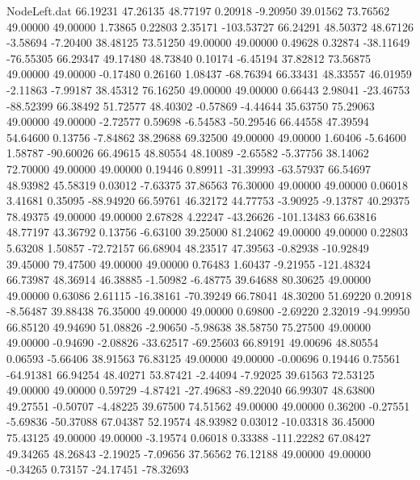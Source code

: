 \begin{filecontents}{NodeLeft.dat}
  66.19231   47.26135   48.77197     0.20918   -9.20950   39.01562   73.76562   49.00000   49.00000    1.73865    0.22803    2.35171 -103.53727
  66.24291   48.50372   48.67126    -3.58694   -7.20400   38.48125   73.51250   49.00000   49.00000    0.49628    0.32874  -38.11649  -76.55305
  66.29347   49.17480   48.73840     0.10174   -6.45194   37.82812   73.56875   49.00000   49.00000   -0.17480    0.26160    1.08437  -68.76394
  66.33431   48.33557   46.01959    -2.11863   -7.99187   38.45312   76.16250   49.00000   49.00000    0.66443    2.98041  -23.46753  -88.52399
  66.38492   51.72577   48.40302    -0.57869   -4.44644   35.63750   75.29063   49.00000   49.00000   -2.72577    0.59698   -6.54583  -50.29546
  66.44558   47.39594   54.64600     0.13756   -7.84862   38.29688   69.32500   49.00000   49.00000    1.60406   -5.64600    1.58787  -90.60026
  66.49615   48.80554   48.10089    -2.65582   -5.37756   38.14062   72.70000   49.00000   49.00000    0.19446    0.89911  -31.39993  -63.57937
  66.54697   48.93982   45.58319     0.03012   -7.63375   37.86563   76.30000   49.00000   49.00000    0.06018    3.41681    0.35095  -88.94920
  66.59761   46.32172   44.77753    -3.90925   -9.13787   40.29375   78.49375   49.00000   49.00000    2.67828    4.22247  -43.26626 -101.13483
  66.63816   48.77197   43.36792     0.13756   -6.63100   39.25000   81.24062   49.00000   49.00000    0.22803    5.63208    1.50857  -72.72157
  66.68904   48.23517   47.39563    -0.82938  -10.92849   39.45000   79.47500   49.00000   49.00000    0.76483    1.60437   -9.21955 -121.48324
  66.73987   48.36914   46.38885    -1.50982   -6.48775   39.64688   80.30625   49.00000   49.00000    0.63086    2.61115  -16.38161  -70.39249
  66.78041   48.30200   51.69220     0.20918   -8.56487   39.88438   76.35000   49.00000   49.00000    0.69800   -2.69220    2.32019  -94.99950
  66.85120   49.94690   51.08826    -2.90650   -5.98638   38.58750   75.27500   49.00000   49.00000   -0.94690   -2.08826  -33.62517  -69.25603
  66.89191   49.00696   48.80554     0.06593   -5.66406   38.91563   76.83125   49.00000   49.00000   -0.00696    0.19446    0.75561  -64.91381
  66.94254   48.40271   53.87421    -2.44094   -7.92025   39.61563   72.53125   49.00000   49.00000    0.59729   -4.87421  -27.49683  -89.22040
  66.99307   48.63800   49.27551    -0.50707   -4.48225   39.67500   74.51562   49.00000   49.00000    0.36200   -0.27551   -5.69836  -50.37088
  67.04387   52.19574   48.93982     0.03012  -10.03318   36.45000   75.43125   49.00000   49.00000   -3.19574    0.06018    0.33388 -111.22282
  67.08427   49.34265   48.26843    -2.19025   -7.09656   37.56562   76.12188   49.00000   49.00000   -0.34265    0.73157  -24.17451  -78.32693

\end{filecontents}
